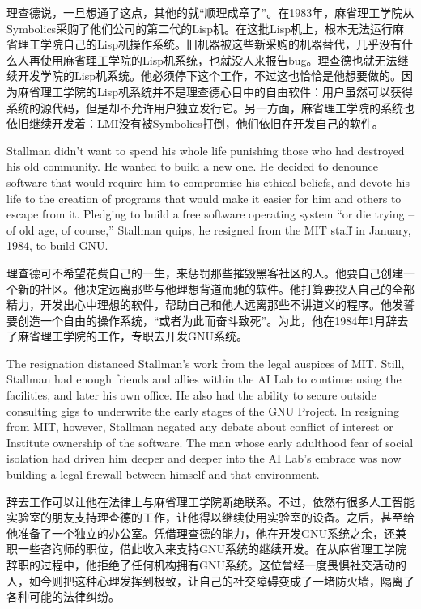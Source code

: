 \ifdefined\chs
理查德说，一旦想通了这点，其他的就“顺理成章了”。在1983年，麻省理工学院从Symbolics采购了他们公司的第二代的Lisp机。在这批Lisp机上，根本无法运行麻省理工学院自己的Lisp机操作系统。旧机器被这些新采购的机器替代，几乎没有什么人再使用麻省理工学院的Lisp机系统，也就没人来报告bug。理查德也就无法继续开发学院的Lisp机系统。他必须停下这个工作，不过这也恰恰是他想要做的。因为麻省理工学院的Lisp机系统并不是理查德心目中的自由软件：用户虽然可以获得系统的源代码，但是却不允许用户独立发行它。另一方面，麻省理工学院的系统也依旧继续开发着：LMI没有被Symbolics打倒，他们依旧在开发自己的软件。
\fi

\ifdefined\eng
Stallman didn't want to spend his whole life punishing those who had destroyed his old community.  He wanted to build a new one. He decided to denounce software that would require him to compromise his ethical beliefs, and devote his life to the creation of programs that would make it easier for him and others to escape from it. Pledging to build a free software operating system ``or die trying -- of old age, of course,'' Stallman quips, he resigned from the MIT staff in January, 1984, to build GNU.
\fi

\ifdefined\chs
理查德可不希望花费自己的一生，来惩罚那些摧毁黑客社区的人。他要自己创建一个新的社区。他决定远离那些与他理想背道而驰的软件。他打算要投入自己的全部精力，开发出心中理想的软件，帮助自己和他人远离那些不讲道义的程序。他发誓要创造一个自由的操作系统，“或者为此而奋斗致死”。为此，他在1984年1月辞去了麻省理工学院的工作，专职去开发GNU系统。
\fi

\ifdefined\eng
The resignation distanced Stallman's work from the legal auspices of MIT. Still, Stallman had enough friends and allies within the AI Lab to continue using the facilities, and later his own office. He also had the ability to secure outside consulting gigs to underwrite the early stages of the GNU Project. In resigning from MIT, however, Stallman negated any debate about conflict of interest or Institute ownership of the software. The man whose early adulthood fear of social isolation had driven him deeper and deeper into the AI Lab's embrace was now building a legal firewall between himself and that environment.
\fi

\ifdefined\chs
辞去工作可以让他在法律上与麻省理工学院断绝联系。不过，依然有很多人工智能实验室的朋友支持理查德的工作，让他得以继续使用实验室的设备。之后，甚至给他准备了一个独立的办公室。凭借理查德的能力，他在开发GNU系统之余，还兼职一些咨询师的职位，借此收入来支持GNU系统的继续开发。在从麻省理工学院辞职的过程中，他拒绝了任何机构拥有GNU系统。这位曾经一度畏惧社交活动的人，如今则把这种心理发挥到极致，让自己的社交障碍变成了一堵防火墙，隔离了各种可能的法律纠纷。
\fi

